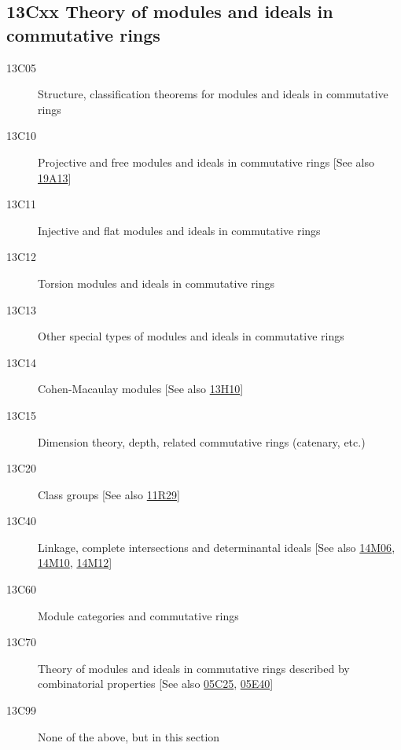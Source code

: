 \documentclass[letterpaper]{article}
\begin{document}
\subsection*{13Cxx Theory of modules and ideals in commutative rings}\label{13Cxx}
\begin{description}               
\item [13C05]\label{13C05} Structure, classification theorems for modules and ideals in commutative rings
\item [13C10]\label{13C10} Projective and free modules and ideals in commutative rings [See also \hyperref[19A13]{19A13}]
\item [13C11]\label{13C11} Injective and flat modules and ideals in commutative rings
\item [13C12]\label{13C12} Torsion modules and ideals in commutative rings
\item [13C13]\label{13C13} Other special types of modules and ideals in commutative rings
\item [13C14]\label{13C14} Cohen-Macaulay modules [See also \hyperref[13H10]{13H10}]
\item [13C15]\label{13C15} Dimension theory, depth, related commutative rings (catenary, etc.)
\item [13C20]\label{13C20} Class groups [See also \hyperref[11R29]{11R29}]
\item [13C40]\label{13C40} Linkage, complete intersections and determinantal ideals [See also \hyperref[14M06]{14M06}, \hyperref[14M10]{14M10}, \hyperref[14M12]{14M12}]
\item [13C60]\label{13C60} Module categories and commutative rings
\item [13C70]\label{13C70} Theory of modules and ideals in commutative rings described by combinatorial properties [See also \hyperref[05C25]{05C25}, \hyperref[05E40]{05E40}]
\item [13C99]\label{13C99} None of the above, but in this section
\end{description}          
\end{document}

